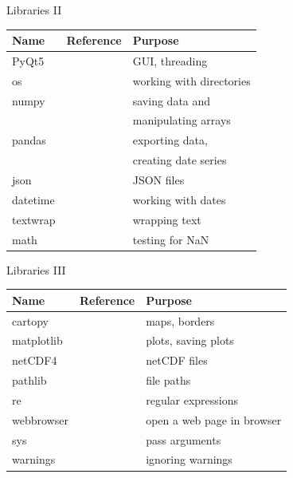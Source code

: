 \documentclass[
    hyperref={
        final,
        colorlinks=true,
        menucolor=black,
        anchorcolor=green,
        linkcolor=blue,
        citecolor=red,
        pdftitle={RS RAS Internship Presentation},
        pdfauthor={Moritz M. Konarski}
    }
]{beamer}
\begin{document}
\begin{frame}{Libraries II}
    \center
    \begin{tabular}{| l | l | l |}\hline
        Name        & Reference         & Purpose\\\hline\hline
        PyQt5       & \cite{pyqt}       & GUI, threading\\\hline
        os          & \cite{py-os}      & working with directories\\\hline
        numpy       & \cite{py-numpy}   & saving data and 
                                \\&&manipulating arrays\\\hline
        pandas      & \cite{pandas}     & exporting data, 
                                        \\&&creating date series\\\hline
        json        & \cite{py-json}    & JSON files\\\hline
        datetime    & \cite{py-datetime}& working with dates\\\hline
        textwrap    & \cite{py-textwrap}& wrapping text\\\hline
        math        & \cite{py-math}    & testing for NaN\\\hline
    \end{tabular}
\end{frame}

\begin{frame}{Libraries III}
    \center
    \begin{tabular}{| l | l | l |}\hline
        Name        & Reference         & Purpose\\\hline\hline
        cartopy     & \cite{py-cartopy} & maps, borders \\\hline
        matplotlib  & \cite{py-mpl}     & plots, saving plots\\\hline
        netCDF4     & \cite{netcdf4}    & netCDF files\\\hline
        pathlib     & \cite{pathlib}    & file paths\\\hline
        re          & \cite{py-re}      & regular expressions\\\hline
        webbrowser  & \cite{browser}    & open a web page in browser\\\hline
        sys         & \cite{py-sys}     & pass arguments\\\hline
        warnings    & \cite{warnings}   & ignoring warnings\\\hline
    \end{tabular}
\end{frame}
\end{document}
